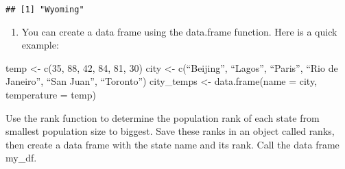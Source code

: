 \documentclass[
]{article}
\newenvironment{Shaded}{\begin{snugshade}}{\end{snugshade}}
\newcommand{\AttributeTok}[1]{\textcolor[rgb]{0.77,0.63,0.00}{#1}}
\newcommand{\FunctionTok}[1]{\textcolor[rgb]{0.00,0.00,0.00}{#1}}
\newcommand{\NormalTok}[1]{#1}
\newcommand{\OtherTok}[1]{\textcolor[rgb]{0.56,0.35,0.01}{#1}}
\newcommand{\SpecialCharTok}[1]{\textcolor[rgb]{0.00,0.00,0.00}{#1}}
\providecommand{\tightlist}{%
  \setlength{\itemsep}{0pt}\setlength{\parskip}{0pt}}
\begin{document}
\begin{Shaded}
\end{Shaded}

\begin{verbatim}
## [1] "Wyoming"
\end{verbatim}

\begin{enumerate}
\def\labelenumi{\arabic{enumi}.}
\setcounter{enumi}{4}
\tightlist
\item
  You can create a data frame using the data.frame function. Here is a
  quick example:
\end{enumerate}

temp \textless- c(35, 88, 42, 84, 81, 30) city \textless- c(``Beijing'',
``Lagos'', ``Paris'', ``Rio de Janeiro'', ``San Juan'', ``Toronto'')
city\_temps \textless- data.frame(name = city, temperature = temp)

Use the rank function to determine the population rank of each state
from smallest population size to biggest. Save these ranks in an object
called ranks, then create a data frame with the state name and its rank.
Call the data frame my\_df.

\begin{Shaded}
\end{Shaded}
\end{document}
